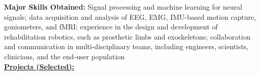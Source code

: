\smallskip
{\small{\color{skills}\textbf{Major Skills Obtained:}} Signal processing and machine learning for neural signals; data acquisition and analysis of EEG, EMG, IMU-based motion capture, goniometers, and fMRI; experience in the design and development of rehabilitation robotics, such as prosthetic limbs and exoskeletons; collaboration and communication in multi-disciplinary teams, including engineers, scientists, clinicians, and the end-user population} \\
\smallskip
{\color{accent}\underline{\textbf{Projects (Selected):}}}\\
